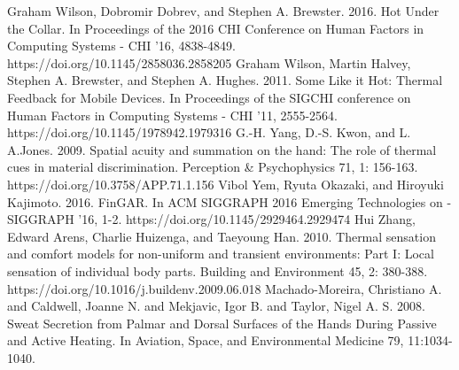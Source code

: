 \documentclass[preprint,12pt]{elsarticle}
\begin{document}
\begin{thebibliography}{00}
Graham Wilson, Dobromir Dobrev, and Stephen A. Brewster. 2016. Hot Under the Collar. In Proceedings of the 2016 CHI Conference on Human Factors in Computing Systems - CHI '16, 4838-4849. https://doi.org/10.1145/2858036.2858205
Graham Wilson, Martin Halvey, Stephen A. Brewster, and Stephen A. Hughes. 2011. Some Like it Hot: Thermal Feedback for Mobile Devices. In Proceedings of the SIGCHI conference on Human Factors in Computing Systems - CHI '11, 2555-2564. https://doi.org/10.1145/1978942.1979316
G.-H. Yang, D.-S. Kwon, and L. A.Jones. 2009. Spatial acuity and summation on the hand: The role of thermal cues in material discrimination. Perception \& Psychophysics 71, 1: 156-163. https://doi.org/10.3758/APP.71.1.156
Vibol Yem, Ryuta Okazaki, and Hiroyuki Kajimoto. 2016. FinGAR. In ACM SIGGRAPH 2016 Emerging Technologies on - SIGGRAPH '16, 1-2. https://doi.org/10.1145/2929464.2929474
Hui Zhang, Edward Arens, Charlie Huizenga, and Taeyoung Han. 2010. Thermal sensation and comfort models for non-uniform and transient environments: Part I: Local sensation of individual body parts. Building and Environment 45, 2: 380-388. https://doi.org/10.1016/j.buildenv.2009.06.018
Machado-Moreira, Christiano A. and Caldwell, Joanne N. and Mekjavic, Igor B. and Taylor, Nigel A. S. 2008. Sweat Secretion from Palmar and Dorsal Surfaces of the Hands During Passive and Active Heating. In Aviation, Space, and Environmental Medicine 79, 11:1034-1040.


\end{thebibliography}
\end{document}
